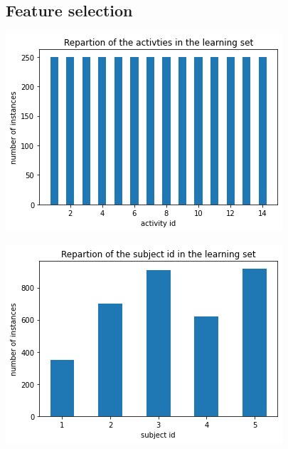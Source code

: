 \documentclass[a4paper, 11pt, oneside]{article}
\begin{document}
\subsection{Feature selection}

\begin{center}
    \begin{minipage}{0.5\linewidth}
    \includegraphics[width=\linewidth]{preprocessing/activity_repartition.png}
    \end{minipage}%
    \begin{minipage}{0.5\linewidth}
    \includegraphics[width=\linewidth]{preprocessing/subjects_repartition.png}

    \end{minipage}
\end{center}
\end{document}
